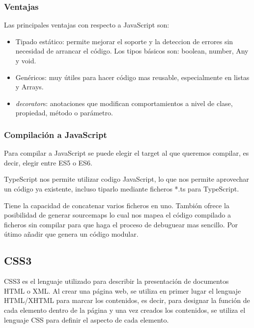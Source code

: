 \documentclass[a4paper, 12pt]{book}
\begin{document}
\subsubsection{Ventajas}
\label{subsec:ventajas}

Las principales ventajas con respecto a JavaScript son:

\begin{itemize}
  \item Tipado est\'atico: permite mejorar el soporte y la deteccion de errores sin necesidad de arrancar el c\'odigo. Los tipos b\'asicos son: boolean, number, Any y void.
\item Gen\'ericos: muy \'utiles para hacer c\'odigo mas reusable, especialmente en listas y Arrays.
\item \emph{decorator}s: anotaciones que modifican comportamientos a nivel de clase, propiedad, m\'etodo o par\'ametro.

\end{itemize}

\subsubsection{Compilaci\'on a JavaScript}
\label{subsec:compilacion}

Para compilar a JavaScript se puede elegir el target al que queremos compilar, es decir, elegir entre ES5 o ES6.

TypeScript nos permite utilizar codigo JavaScript, lo que nos permite aprovechar un c\'odigo ya existente, incluso tiparlo mediante ficheros *.ts para TypeScript.

Tiene la capacidad de concatenar varios ficheros en uno. Tambi\'on ofrece la posibilidad de generar sourcemaps lo cual nos mapea el c\'odigo compilado a ficheros sin compilar para que haga el proceso de debuguear mas sencillo. Por \'utimo a\~nadir que genera un c\'odigo modular.

\subsection{CSS3}
\label{subsec:estilo}

CSS3 \cite{Css3} es el lenguaje utilizado para describir la presentaci\'on de documentos HTML o XML. Al
crear una p\'agina web, se utiliza en primer lugar el lenguaje HTML/XHTML para marcar los
contenidos, es decir, para designar la funci\'on de cada elemento dentro de la p\'agina y una vez
creados los contenidos, se utiliza el lenguaje CSS para definir el aspecto de cada elemento.
\end{document}
